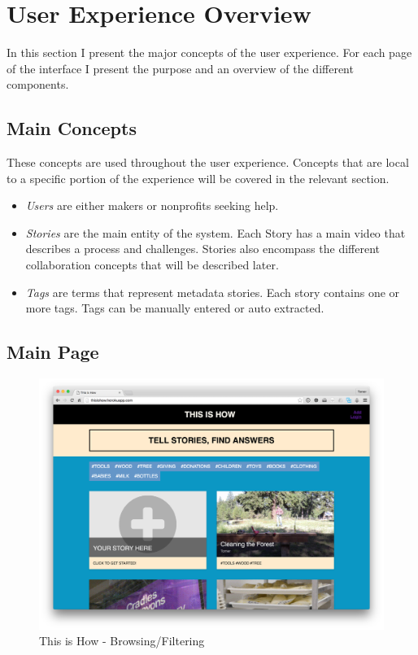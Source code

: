 \section{User Experience Overview}

In this section I present the major concepts of the user experience. For each page of the interface I present the purpose and an overview of the different components. 

\subsection{Main Concepts}

These concepts are used throughout the user experience. Concepts that are local to a specific portion of the experience will be covered in the relevant section.

\begin{itemize}
\item \textit{Users} are either makers or nonprofits seeking help.

\item \textit{Stories} are the main entity of the system. Each Story has a main video that describes a process and challenges. Stories also encompass the different collaboration concepts that will be described later.

\item \textit{Tags} are terms that represent metadata stories. Each story contains one or more tags. Tags can be manually entered or auto extracted. 
\end{itemize}


\subsection{Main Page}

   \begin{figure}[thpb]
      \centering
      \includegraphics[width=\textwidth]{figures/mainpage.png}
      \caption{This is How - Browsing/Filtering}
      \label{fig_main_page}
   \end{figure}

